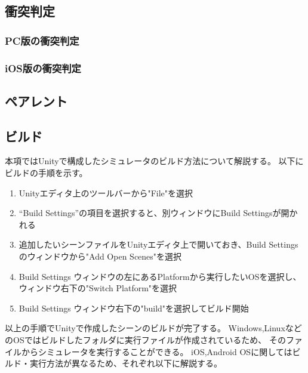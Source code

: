 \documentclass{ltjsreport}
\begin{document}
		\subsection{衝突判定}
			
			\subsubsection{PC版の衝突判定}
			\subsubsection{iOS版の衝突判定}
		\subsection{ペアレント}
		\subsection{ビルド}
			本項ではUnityで構成したシミュレータのビルド方法について解説する。
			以下にビルドの手順を示す。
			\begin{enumerate}
				\item Unityエディタ上のツールバーから"File"を選択
				\item ``Build Settings''の項目を選択すると、別ウィンドウにBuild Settingsが開かれる
				\item 追加したいシーンファイルをUnityエディタ上で開いておき、Build Settingsのウィンドウから"Add Open Scenes"を選択
				\item Build Settings ウィンドウの左にあるPlatformから実行したいOSを選択し、ウィンドウ右下の"Switch Platform"を選択
				\item Build Settings ウィンドウ右下の"build"を選択してビルド開始
			\end{enumerate}
			以上の手順でUnityで作成したシーンのビルドが完了する。
			Windows,LinuxなどのOSではビルドしたフォルダに実行ファイルが作成されているため、
			そのファイルからシミュレータを実行することができる。
			iOS,Android OSに関してはビルド・実行方法が異なるため、それぞれ以下に解説する。
\end{document}
